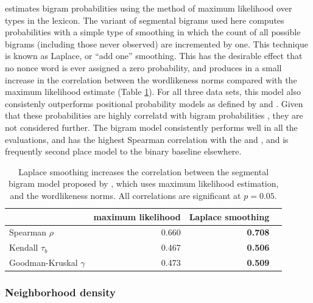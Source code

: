 \citeauthor{Albright2009a} estimates bigram probabilities using the method of maximum likelihood over types in the lexicon. The variant of segmental bigrams used here computes probabilities with a simple type of smoothing in which the count of all possible bigrams (including those never observed) are incremented by one. This technique is known as Laplace, or ``add one'' smoothing. This has the desirable effect that no nonce word is ever assigned a zero probability, and produces in a small increase in the correlation between the \citeauthor{Albright2003b} wordlikeness norms compared with the maximum likelihood estimate (Table \ref{albrightimproved}). For all three data sets, this model also consistenly outperforms positional probability models as defined by \citet{Vitevitch2004} and \citet{Vaden2009}. Given that these probabilities are highly correlatd with bigram probabilities \citep[][54]{Vitevitch1997}, they are not considered further. The bigram model consistently performs well in all the evaluations, and has the highest Spearman correlation with the \citeauthor{Greenberg1964} and \citeauthor{Scholes1966}, and is frequently second place model to the binary baseline elsewhere.

\begin{table} \centering
\begin{tabular}{l r r r}
\toprule
                         & maximum likelihood & Laplace smoothing \\
\midrule
Spearman $\rho$          & 0.660              & \textbf{0.708} \\
Kendall $\tau_b$         & 0.467              & \textbf{0.506} \\
Goodman-Kruskal $\gamma$ & 0.473              & \textbf{0.509} \\
\bottomrule
\end{tabular}
\caption{Laplace smoothing increases the correlation between the segmental bigram model proposed by \citet{Albright2009a}, which uses maximum likelihood estimation, and the \citet{Albright2003b} wordlikeness norms. All correlations are significant at $p = 0.05$.}
\label{albrightimproved}
\end{table}

\subsubsection{Neighborhood density} \label{density}

